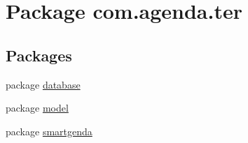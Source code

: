 \hypertarget{namespacecom_1_1agenda_1_1ter}{\section{Package com.\-agenda.\-ter}
\label{namespacecom_1_1agenda_1_1ter}
}
\subsection*{Packages}
\begin{DoxyCompactItemize}
\item 
package \hyperlink{namespacecom_1_1agenda_1_1ter_1_1database}{database}
\item 
package \hyperlink{namespacecom_1_1agenda_1_1ter_1_1model}{model}
\item 
package \hyperlink{namespacecom_1_1agenda_1_1ter_1_1smartgenda}{smartgenda}
\end{DoxyCompactItemize}
